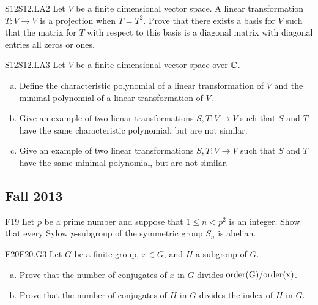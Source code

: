 \documentclass[../AlgebraQualSolutions.tex]{subfiles}
\begin{document}
	\begin{prob}{S12}{S12.LA2}
		Let $V$ be a finite dimensional vector space. A linear transformation $T: V \to V$ is a projection when $T = T^2$. Prove that there exists a basis for $V$ such that the matrix for $T$ with respect to this basis is a diagonal matrix with diagonal entries all zeros or ones.
	\end{prob}

	\begin{prob}{S12}{S12.LA3}
		Let $V$ be a finite dimensional vector space over $\mathbb{C}$.

		\begin{enumerate}[(a)]
			\item Define the characteristic polynomial of a linear transformation of $V$ and the minimal polynomial of a linear transformation of $V$.
			\item Give an example of two lienar transformations $S,T: V \to V$ such that $S$ and $T$ have the same characteristic polynomial, but are not similar.
			\item Give an example of two linear transformations $S,T: V \to V$ such that $S$ and $T$ have the same minimal polynomial, but are not similar.
		\end{enumerate}
	\end{prob}

	\subsection{Fall 2013}

	

	\begin{prob}{F19}{}
	Let $p$ be a prime number and suppose that $1 \leq n <p^2$ is an integer. Show that every Sylow $p$-subgroup of the symmetric group $S_n$ is abelian.
	\end{prob}
	

	\begin{prob}{F20}{F20.G3}
	Let $G$ be a finite group, $x \in G$, and $H$ a subgroup of $G$.
	\begin{enumerate}[(a)]
	\item Prove that the number of conjugates of $x$ in $G$ divides $\rm{order}(G)/\rm{order}(x)$.
	\item Prove that the number of conjugates of $H$ in $G$ divides the index of $H$ in $G$.
	\end{enumerate}
	\end{prob}
\end{document}
